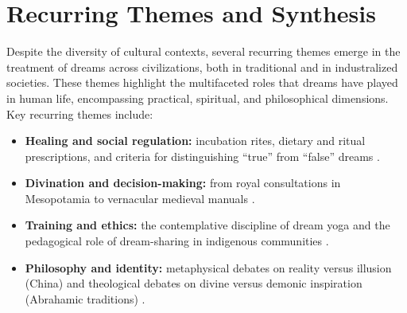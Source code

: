 \section{Recurring Themes and Synthesis}\label{sec:recurring_themes}

Despite the diversity of cultural contexts, several recurring themes emerge in the treatment of dreams across civilizations, both in traditional and in industralized societies. These themes highlight the multifaceted roles that dreams have played in human life, encompassing practical, spiritual, and philosophical dimensions. Key recurring themes include:

\begin{itemize}
  \item \textbf{Healing and social regulation:} incubation rites, dietary and ritual prescriptions, and criteria for distinguishing “true” from “false” dreams \citep{lidonnici1995epidaurus,miller1994lateantiquity}.
  \item \textbf{Divination and decision-making:} from royal consultations in Mesopotamia to vernacular medieval manuals \citep{oppenheim1956dreams,cappozzo2018somniale}.
  \item \textbf{Training and ethics:} the contemplative discipline of dream yoga and the pedagogical role of dream-sharing in indigenous communities \citep{wangyal2001tibetan,tedlock1987anthrodreaming}.
  \item \textbf{Philosophy and identity:} metaphysical debates on reality versus illusion (China) and theological debates on divine versus demonic inspiration (Abrahamic traditions) \citep{campany2003dreamscape,miller1994lateantiquity}.
\end{itemize}